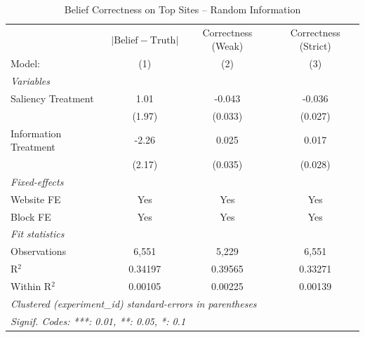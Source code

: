 
\begin{table}[htbp]
   \caption{Belief Correctness on Top Sites -- Random Information}
   \centering
   \begin{tabular}{lccc}
      \tabularnewline \midrule \midrule
                            & $\lvert \text{Belief} - \text{Truth} \rvert$     & Correctness (Weak) & Correctness (Strict) \\   
      Model:                & (1)                                              & (2)                & (3)\\  
      \midrule
      \emph{Variables}\\
      Saliency Treatment    & 1.01                                             & -0.043             & -0.036\\   
                            & (1.97)                                           & (0.033)            & (0.027)\\   
      Information Treatment & -2.26                                            & 0.025              & 0.017\\   
                            & (2.17)                                           & (0.035)            & (0.028)\\   
      \midrule
      \emph{Fixed-effects}\\
      Website FE            & Yes                                              & Yes                & Yes\\  
      Block FE              & Yes                                              & Yes                & Yes\\  
      \midrule
      \emph{Fit statistics}\\
      Observations          & 6,551                                            & 5,229              & 6,551\\  
      R$^2$                 & 0.34197                                          & 0.39565            & 0.33271\\  
      Within R$^2$          & 0.00105                                          & 0.00225            & 0.00139\\  
      \midrule \midrule
      \multicolumn{4}{l}{\emph{Clustered (experiment\_id) standard-errors in parentheses}}\\
      \multicolumn{4}{l}{\emph{Signif. Codes: ***: 0.01, **: 0.05, *: 0.1}}\\
   \end{tabular}
\end{table}


